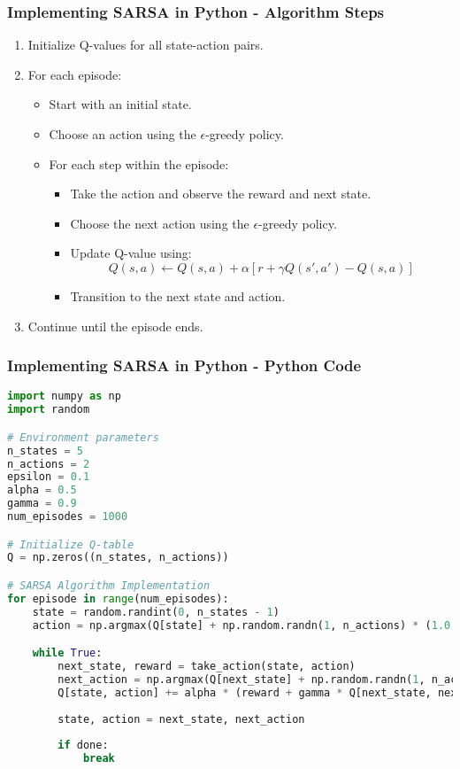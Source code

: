 \documentclass[aspectratio=169]{beamer}
\begin{document}
\begin{frame}[fragile]
    \frametitle{Implementing SARSA in Python - Algorithm Steps}
    \begin{enumerate}
        \item Initialize Q-values for all state-action pairs.
        \item For each episode:
            \begin{itemize}
                \item Start with an initial state.
                \item Choose an action using the $\epsilon$-greedy policy.
                \item For each step within the episode:
                    \begin{itemize}
                        \item Take the action and observe the reward and next state.
                        \item Choose the next action using the $\epsilon$-greedy policy.
                        \item Update Q-value using:
                        \begin{equation}
                        Q(s, a) \leftarrow Q(s, a) + \alpha \left[ r + \gamma Q(s', a') - Q(s, a) \right]
                        \end{equation}
                        \item Transition to the next state and action.
                    \end{itemize}
            \end{itemize}
        \item Continue until the episode ends.
    \end{enumerate}
\end{frame}

\begin{frame}[fragile]
    \frametitle{Implementing SARSA in Python - Python Code}
    \begin{lstlisting}[language=Python]
import numpy as np
import random

# Environment parameters
n_states = 5
n_actions = 2
epsilon = 0.1
alpha = 0.5
gamma = 0.9
num_episodes = 1000

# Initialize Q-table
Q = np.zeros((n_states, n_actions))

# SARSA Algorithm Implementation
for episode in range(num_episodes):
    state = random.randint(0, n_states - 1)
    action = np.argmax(Q[state] + np.random.randn(1, n_actions) * (1.0 / (episode + 1)))

    while True:
        next_state, reward = take_action(state, action)
        next_action = np.argmax(Q[next_state] + np.random.randn(1, n_actions) * (1.0 / (episode + 1)))
        Q[state, action] += alpha * (reward + gamma * Q[next_state, next_action] - Q[state, action])
        
        state, action = next_state, next_action
        
        if done:
            break
    \end{lstlisting}
\end{frame}
\end{document}
